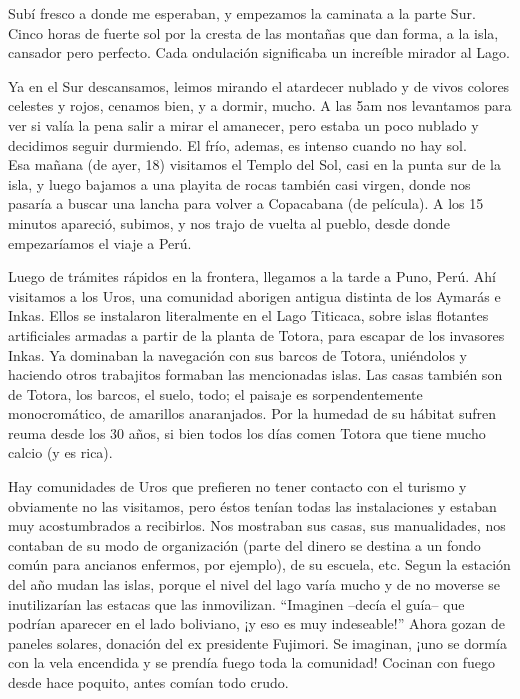 Subí fresco a donde me esperaban, y empezamos la caminata a la parte Sur. Cinco
horas de fuerte sol por la cresta de las montañas que dan forma, a la isla,
cansador pero perfecto. Cada ondulación significaba un increíble mirador al
Lago.

Ya en el Sur descansamos, leimos mirando el atardecer nublado y de vivos colores
celestes y rojos, cenamos bien, y a dormir, mucho. A las 5am nos levantamos para
ver si valía la pena salir a mirar el amanecer, pero estaba un poco nublado y
decidimos seguir durmiendo. El frío, ademas, es intenso cuando no hay sol.\\

Esa mañana (de ayer, 18) visitamos el Templo del Sol, casi en la punta sur de
la isla, y luego bajamos a una playita de rocas también casi virgen, donde nos
pasaría a buscar una lancha para volver a Copacabana (de película). A los 15
minutos apareció, subimos, y nos trajo de vuelta al pueblo, desde donde
empezaríamos el viaje a Perú.

Luego de trámites rápidos en la frontera, llegamos a la tarde a Puno, Perú.
Ahí visitamos a los Uros, una comunidad aborigen antigua distinta de los
Aymarás e Inkas. Ellos se instalaron literalmente en el Lago Titicaca, sobre
islas flotantes artificiales armadas a partir de la planta de Totora, para
escapar de los invasores Inkas. Ya dominaban la navegación con sus barcos de
Totora, uniéndolos y haciendo otros trabajitos formaban las mencionadas islas.
Las casas también son de Totora, los barcos, el suelo, todo; el paisaje es
sorpendentemente monocromático, de amarillos anaranjados. Por la humedad de su
hábitat sufren reuma desde los 30 años, si bien todos los días comen Totora
que tiene mucho calcio (y es rica).

Hay comunidades de Uros que prefieren no tener contacto con el turismo y
obviamente no las visitamos, pero éstos tenían todas las instalaciones y
estaban muy acostumbrados a recibirlos. Nos mostraban sus casas, sus
manualidades, nos contaban de su modo de organización (parte del dinero se
destina a un fondo común para ancianos enfermos, por ejemplo), de su escuela,
etc. Segun la estación del año mudan las islas, porque el nivel del lago
varía mucho y de no moverse se inutilizarían las estacas que las
inmovilizan. ``Imaginen --decía el guía-- que podrían aparecer en el lado
boliviano, ¡y eso es muy indeseable!'' Ahora gozan de paneles
solares, donación del ex presidente Fujimori. Se imaginan, ¡uno
se dormía con la vela encendida y se prendía fuego toda la comunidad! Cocinan
con fuego desde hace poquito, antes comían todo crudo.

